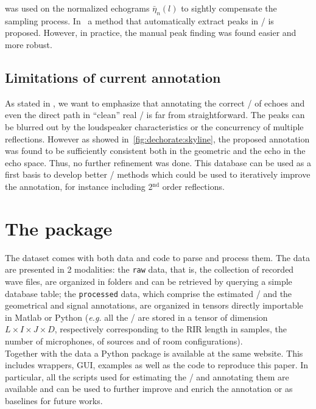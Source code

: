 was used on the normalized echograms $\bar{\eta}_{n}(l)$ to sightly compensate the sampling process. In~ a method that automatically extract peaks in \RIRs/ is proposed.
However, in practice, the manual peak finding was found easier and more robust.

\subsection{Limitations of current annotation}
As stated in , we want to emphasize that annotating the correct \TOAs/ of echoes and even the direct path in ``clean'' real \RIRs/ is far from straightforward.
The peaks can be blurred out by the loudspeaker characteristics or the concurrency of multiple reflections.
However as showed in~\cref{fig:dechorate:skyline}, the proposed annotation was found to be sufficiently consistent both in the geometric and the echo in the echo space.
Thus, no further refinement was done.
This database can be used as a first basis to develop better \AER/ methods which could be used to iteratively improve the annotation, for instance including  2$^\text{nd}$ order reflections.

\section{The  package}
The dataset comes with both data and code to parse and process them. The data are presented in 2 modalities: the \texttt{raw} data, that is, the collection of recorded wave files, are organized in folders and can be retrieved by querying a simple database table; the \texttt{processed} data, which comprise the estimated \RIRs/ and the geometrical and signal annotations, are organized in tensors directly importable in Matlab or Python (\textit{e.g.} all the \RIRs/ are stored in a tensor of dimension $L \times I \times J \times D$, respectively corresponding to the RIR length in samples, the number of microphones, of sources and of room configurations).
\\Together with the data a Python package is available at the same website. This includes wrappers, GUI, examples as well as the code to reproduce this paper.
In particular, all the scripts used for estimating the \RIRs/ and annotating them are available and can be used to further improve and enrich the annotation or as baselines for future works.

